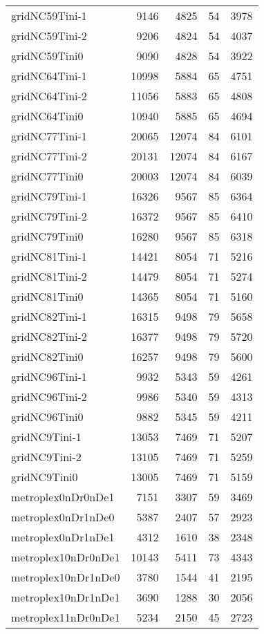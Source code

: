 \begin{longtable}{lrrrr}
gridNC59Tini-1 & 9146 & 4825 & 54 & 3978 \\
gridNC59Tini-2 & 9206 & 4824 & 54 & 4037 \\
gridNC59Tini0 & 9090 & 4828 & 54 & 3922 \\
gridNC64Tini-1 & 10998 & 5884 & 65 & 4751 \\
gridNC64Tini-2 & 11056 & 5883 & 65 & 4808 \\
gridNC64Tini0 & 10940 & 5885 & 65 & 4694 \\
gridNC77Tini-1 & 20065 & 12074 & 84 & 6101 \\
gridNC77Tini-2 & 20131 & 12074 & 84 & 6167 \\
gridNC77Tini0 & 20003 & 12074 & 84 & 6039 \\
gridNC79Tini-1 & 16326 & 9567 & 85 & 6364 \\
gridNC79Tini-2 & 16372 & 9567 & 85 & 6410 \\
gridNC79Tini0 & 16280 & 9567 & 85 & 6318 \\
gridNC81Tini-1 & 14421 & 8054 & 71 & 5216 \\
gridNC81Tini-2 & 14479 & 8054 & 71 & 5274 \\
gridNC81Tini0 & 14365 & 8054 & 71 & 5160 \\
gridNC82Tini-1 & 16315 & 9498 & 79 & 5658 \\
gridNC82Tini-2 & 16377 & 9498 & 79 & 5720 \\
gridNC82Tini0 & 16257 & 9498 & 79 & 5600 \\
gridNC96Tini-1 & 9932 & 5343 & 59 & 4261 \\
gridNC96Tini-2 & 9986 & 5340 & 59 & 4313 \\
gridNC96Tini0 & 9882 & 5345 & 59 & 4211 \\
gridNC9Tini-1 & 13053 & 7469 & 71 & 5207 \\
gridNC9Tini-2 & 13105 & 7469 & 71 & 5259 \\
gridNC9Tini0 & 13005 & 7469 & 71 & 5159 \\
metroplex0nDr0nDe1 & 7151 & 3307 & 59 & 3469 \\
metroplex0nDr1nDe0 & 5387 & 2407 & 57 & 2923 \\
metroplex0nDr1nDe1 & 4312 & 1610 & 38 & 2348 \\
metroplex10nDr0nDe1 & 10143 & 5411 & 73 & 4343 \\
metroplex10nDr1nDe0 & 3780 & 1544 & 41 & 2195 \\
metroplex10nDr1nDe1 & 3690 & 1288 & 30 & 2056 \\
metroplex11nDr0nDe1 & 5234 & 2150 & 45 & 2723 \\

\end{longtable}
